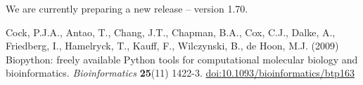 \documentclass[10pt,oneside]{article}
\begin{document}
We are currently preparing a new release -- version 1.70.

\begin{thebibliography}{}

Cock, P.J.A., Antao, T., Chang, J.T., Chapman, B.A., Cox, C.J., Dalke, A., Friedberg, I., Hamelryck, T., Kauff, F., Wilczynski, B., de Hoon, M.J. (2009) Biopython: freely available Python tools for computational molecular biology and bioinformatics. {\it Bioinformatics} {\bf 25}(11) 1422-3. \href{http://dx.doi.org/10.1093/bioinformatics/btp163}{doi:10.1093/bioinformatics/btp163}

\end{thebibliography}
\end{document}
